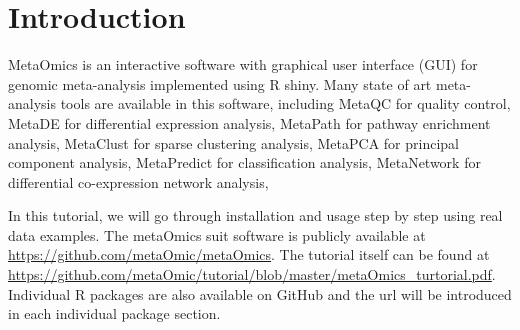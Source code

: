 \section{Introduction}
 
MetaOmics is an interactive software with graphical user interface (GUI) for genomic meta-analysis implemented using R shiny.
Many state of art meta-analysis tools are available in this software,
including MetaQC for quality control, 
MetaDE for differential expression analysis,
MetaPath for pathway enrichment analysis,
MetaClust for sparse clustering analysis,
MetaPCA for principal component analysis,
MetaPredict for classification analysis,
MetaNetwork for differential co-expression network analysis,

In this tutorial, 
we will go through installation and usage step by step using real data examples.
The metaOmics suit software is publicly available at \url{https://github.com/metaOmic/metaOmics}.
The tutorial itself can be found at \url{https://github.com/metaOmic/tutorial/blob/master/metaOmics_turtorial.pdf}.
Individual R packages are also available on GitHub and the url will be introduced in each individual package section.


